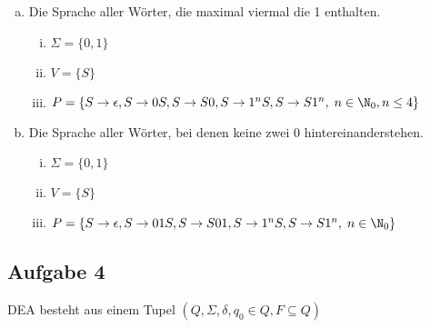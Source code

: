   \begin{enumerate}[a)]
    \item Die Sprache aller Wörter, die maximal viermal die 1 enthalten.

    \begin{enumerate}[i)]
      \item $\Sigma = \{ 0,1 \}$
      \item $V = \{S \} $
      \item $P = \{ S \to \epsilon, S \to 0S, S \to S0, S \to 1^n S, S \to S 1^n, \; n \in \N_{0}, n \leq 4 \}$
    \end{enumerate}

    \item Die Sprache aller Wörter, bei denen keine zwei 0 hintereinanderstehen.

    \begin{enumerate}[i)]
      \item $\Sigma = \{ 0,1 \}$
      \item $V = \{S \} $
      \item $P = \{ S \to \epsilon,
      S \to 01S, S \to S 01,
      S \to 1^{n} S,
      S \to S 1^{n},
      \; n \in \N_{0} \}$
    \end{enumerate}


  \end{enumerate}

  \subsection*{Aufgabe 4}

  DEA besteht aus einem Tupel $  (Q, \Sigma, \delta, q_0 \in Q, F \subseteq Q) $

